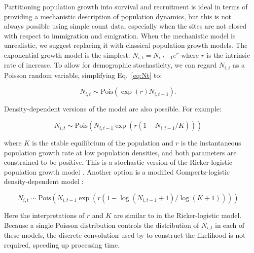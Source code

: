 \documentclass[12pt,english]{article}
\begin{document}
\begin{spacing}{1.9}
\begin{flushleft}
Partitioning population growth into survival and recruitment
is ideal in terms of providing a mechanistic description of population
dynamics, but this is not always possible using simple count data,
especially when the sites are not closed with respect to immigration
and emigration. %
When the mechanistic model is unrealistic, we suggest replacing it
with classical population growth models. %
The exponential growth model is the simplest: 
$N_{i,t} = N_{i,t-1}e^r$ where $r$ is the intrinsic
rate of increase. %
To allow for demographic stochasticity, we can regard $N_{i,t}$ as a Poisson 
random variable, simplifying Eq.~\ref{eq:Nt} to:
\begin{linenomath*}
\begin{equation}
  N_{i,t} \sim \mathrm{Pois}(\exp(r)N_{i,t-1}).
\label{eq:exp}
\end{equation}
\end{linenomath*}

Density-dependent versions of the model are also possible.  For
example:
\begin{linenomath*}
\begin{equation}
  N_{i,t} \sim \mathrm{Pois}(N_{i,t-1}\exp(r(1-N_{i,t-1}/K)))
\label{eq:rick}
\end{equation}
\end{linenomath*}
where $K$ is the stable equilibrium of the population and $r$ is
the instantaneous population growth rate at low population
densities, and both parameters are constrained to be positive. This is
a stochastic version of the Ricker-logistic population growth model
\citep{ricker:1954}. Another option is a modified Gompertz-logistic
density-dependent model \citep{hart_gotelli:2011}:
\begin{linenomath*}
\begin{equation}
N_{i,t} \sim \mathrm{Pois}(N_{i,t-1}\exp(r(1-\log(N_{i,t-1}+1)/\log(K+1))))
\label{eq:gomp}
\end{equation}
\end{linenomath*}
Here the interpretations of $r$ and $K$ are similar to in the
Ricker-logistic model. Because a single Poisson distribution controls
the distribution of $N_{i,t}$ in each of these models, the discrete 
convolution used by \citet{dail_madsen:2011} to construct the
likelihood is not required, speeding up processing time.



\end{flushleft}
\end{spacing}
\end{document}
